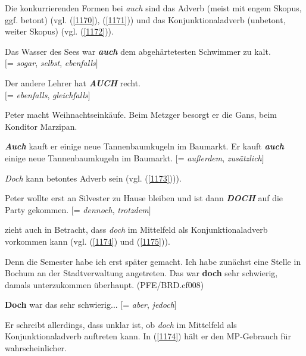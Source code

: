 {Die konkurrierenden Formen bei \textit{auch} sind das  Adverb (meist mit engem Skopus, ggf. betont) (vgl. (\ref{1170}), (\ref{1171})) und das Konjunktionaladverb (unbetont, weiter Skopus) (vgl. (\ref{1172})). 

\begin{exe}
	\ex\label{1170} 
	Das Wasser des Sees war \textbf{\textit{auch}} dem abgehärtetesten Schwimmer zu kalt.\\
	$[$= \textit{sogar}, \textit{selbst}, \textit{ebenfalls}$]$
	\hfill\hbox{\citet[92]{Helbig1990}}
\end{exe}

\begin{exe}
	\ex\label{1171} 
	Der andere Lehrer hat \textbf{\textit{AUCH}} recht.\\
	$[$= \textit{ebenfalls}, \textit{gleichfalls}$]$
	\hfill\hbox{\citet[22]{Mueller2014b}}
\end{exe}							
			
\begin{exe}
	\ex\label{1172} 
	Peter macht Weihnachtseinkäufe. Beim Metzger besorgt er die Gans, beim Konditor Marzipan. 
		\begin{xlist}
			\ex\label{1172a} \textbf{\textit{Auch}} kauft er einige neue Tannenbaumkugeln im Baumarkt.
			\ex\label{1172b} Er kauft \textbf{\textit{auch}} einige neue Tannenbaumkugeln im Baumarkt.
			$[$= \textit{außerdem}, \textit{zusätzlich}$]$
		\hfill\hbox{\citet[22]{Mueller2014b}}	
		\end{xlist}		
\end{exe}
\textit{Doch} kann betontes Adverb sein (vgl. (\ref{1173}))).

\begin{exe}
	\ex\label{1173} 
	Peter wollte erst an Silvester zu Hause bleiben und ist dann \textbf{\textit{DOCH}} auf die Party gekommen. $[$= \textit{dennoch}, \textit{trotzdem}$]$
\end{exe}	
\citet[84]{Kwon2005} zieht auch in Betracht, dass \textit{doch} im Mittelfeld als Konjunktio\-naladverb  vorkommen kann (vgl. (\ref{1174}) und (\ref{1175})).
	
\begin{exe}
	\ex\label{1174} 
	\scriptsize
	Denn die Semester habe ich erst später gemacht. Ich habe zunächst eine Stelle in Bochum an der Stadtverwaltung angetreten. Das war \textbf{doch} sehr 		schwierig, damals unterzukommen überhaupt. 
	\newline
	\hbox{}\hfill\hbox{(PFE/BRD.cf008)}
\end{exe}	
\vspace{-0.5cm}			
\begin{exe}
	\ex\label{1175} 
	\textbf{Doch} war das sehr schwierig... $[$= \textit{aber}, \textit{jedoch}$]$ 
\end{exe}	
Er schreibt allerdings, dass unklar ist, ob \textit{doch} im Mittelfeld als Konjunktionaladverb  auftreten kann. In (\ref{1174}) hält er den MP-Gebrauch für wahrscheinlicher.

}
